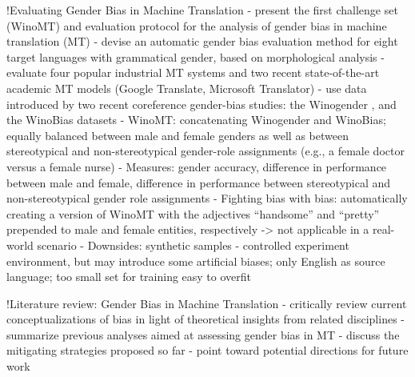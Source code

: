 !Evaluating Gender Bias in Machine Translation \parencite{Stanovsky_2019}
- present the first challenge set (WinoMT) and evaluation protocol for the analysis of gender bias in machine translation (MT)
- devise an automatic gender bias evaluation method for eight target languages with grammatical gender, based on morphological analysis
- evaluate  four popular industrial MT systems and two recent state-of-the-art academic MT models (Google Translate, Microsoft Translator)
- use data introduced by two recent coreference gender-bias studies: the
Winogender \parencite{Rudinger_2018_coreference}, and the WinoBias \cite{Zhao_2018_coreference} datasets
- WinoMT: concatenating Winogender and WinoBias; equally balanced between male and female genders as well as between stereotypical and non-stereotypical gender-role assignments (e.g., a female doctor versus a female nurse)
- Measures: gender accuracy, difference in performance between male and female, difference in performance between stereotypical and non-stereotypical gender role assignments
- Fighting bias with bias: automatically creating a version of WinoMT with the adjectives “handsome” and “pretty” prepended to male and female entities, respectively -> not applicable in a real-world scenario
- Downsides: synthetic samples - controlled experiment environment, but may introduce some artificial biases; only English as source language; too small set for training easy to overfit

!Literature review: Gender Bias in Machine Translation \parencite{Savoldi_2021}
- critically review current conceptualizations of bias in light of theoretical insights from related disciplines
- summarize previous analyses aimed at assessing gender bias in MT
- discuss the mitigating strategies proposed so far
- point toward potential directions for future work
